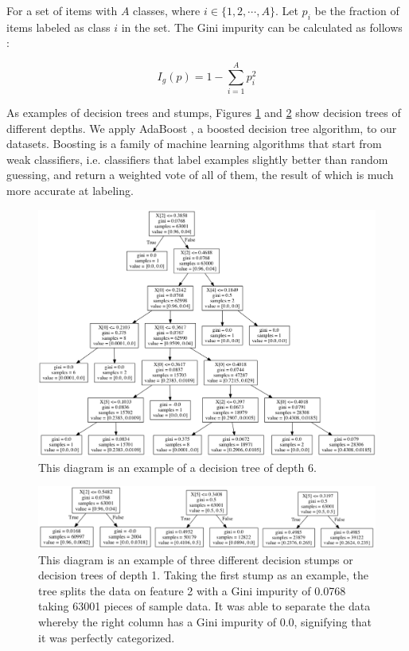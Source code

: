 \documentclass[5p]{elsarticle}
\begin{document}
For a set of items with $A$ classes, where $i \in \{ 1, 2, \cdots , A \} $. Let $p_i$ be the fraction of items labeled as class $i$ in the set. The Gini impurity can be calculated as follows \cite{devet}:

\begin{equation} I_g(p)=1-\sum_{i=1}^{A}p_i^2 
\end{equation}

As examples of decision trees and stumps, Figures \ref{fig:tree} and \ref{fig:stumps} show decision trees of different depths.	
We apply AdaBoost \cite{deset}, a boosted decision tree algorithm, to our datasets. Boosting is a family of machine learning algorithms that start from weak classifiers, i.e. classifiers that label examples slightly better than random guessing, and return a weighted vote of all of them, the result of which is much more accurate at labeling.

\begin{figure}[htbp]
    \centering
    \includegraphics[width=\linewidth]{tree.png}
    \caption{This diagram is an example of a decision tree of depth 6.}
    \label{fig:tree}
\end{figure}

\begin{figure}[htbp]
    \centering
    \includegraphics[width=\linewidth]{stumps.png}
    \caption{This diagram is an example of three different decision stumps or decision trees of depth 1. Taking the first stump as an example, the tree splits the data on feature 2 with a Gini impurity of 0.0768 taking 63001 pieces of sample data. It was able to separate the data whereby the right column has a Gini impurity of 0.0, signifying that it was perfectly categorized.}
    \label{fig:stumps}
\end{figure}
\end{document}
